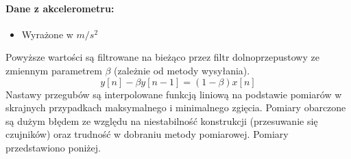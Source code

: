 \documentclass[12pt,a4paper]{article}
\begin{document}
\paragraph{Dane z akcelerometru:}
\begin{itemize}
\item Wyrażone w $m/s^2$
\end{itemize}
Powyższe wartości są filtrowane na bieżąco przez filtr dolnoprzepustowy ze zmiennym parametrem $\beta$ (zależnie od metody wysyłania).
\begin{equation} \label{eq:1}
y[n] - \beta y[n-1] = (1-\beta)x[n]
\end{equation}
Nastawy przegubów są interpolowane funkcją liniową na podstawie pomiarów w skrajnych przypadkach maksymalnego i minimalnego zgięcia. Pomiary obarczone są dużym błędem ze względu na niestabilność konstrukcji (przesuwanie się czujników) oraz trudność w dobraniu metody pomiarowej. Pomiary przedstawiono poniżej.
\end{document}
